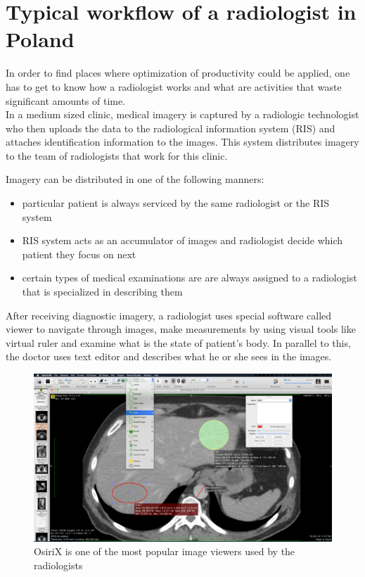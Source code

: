 \documentclass[12pt, twoside, openany]{report}
\theoremstyle{definition}
\begin{document}
\section{Typical workflow of a radiologist in Poland}
In order to find places where optimization of productivity could be applied, one has to get to know how a radiologist works and what are activities that waste significant amounts of time. \\
In a medium sized clinic, medical imagery is captured by a radiologic technologist who then uploads the data to the radiological information system (RIS) and attaches identification information to the images. This system distributes imagery to the team of radiologists that work for this clinic. 

Imagery can be distributed in one of the following manners:
\begin{itemize}
    \item particular patient is always serviced by the same radiologist or the RIS system 
    \item RIS system acts as an accumulator of images and radiologist decide which patient they focus on next
    \item certain types of medical examinations are are always assigned to a radiologist that is specialized in describing them
\end{itemize}

After receiving diagnostic imagery, a radiologist uses special software called viewer\cite{viewer} to navigate through images, make measurements by using visual tools like virtual ruler and examine what is the state of patient's body. In parallel to this, the doctor uses text editor and describes what he or she sees in the images. 
\begin{figure}
    \centering
    \includegraphics[width=0.9\linewidth]{osirix}
    \caption{OsiriX is one of the most popular image viewers used by the radiologists}
    \label{fig:osirix}
\end{figure}
\end{document}
